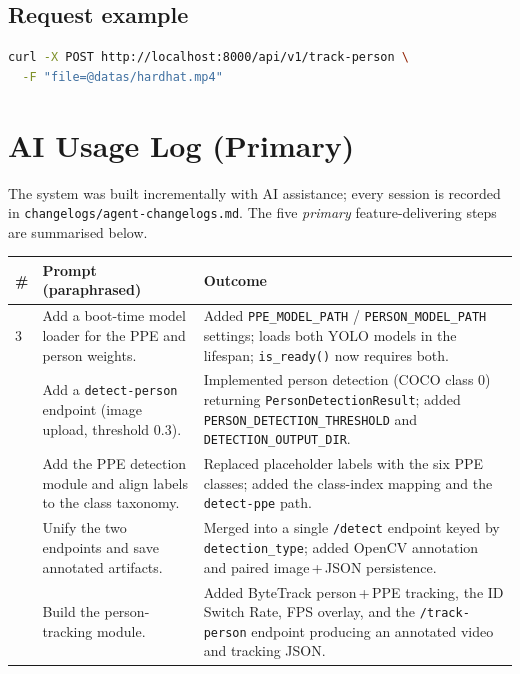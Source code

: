 \documentclass[11pt,a4paper]{article}
\begin{document}
\subsection{Request example}
\begin{lstlisting}[language=bash]
curl -X POST http://localhost:8000/api/v1/track-person \
  -F "file=@datas/hardhat.mp4"
\end{lstlisting}

\section{AI Usage Log (Primary)}

The system was built incrementally with AI assistance; every session is
recorded in \verb|changelogs/agent-changelogs.md|. The five \emph{primary}
feature-delivering steps are summarised below.

\begin{longtable}{p{0.5cm} p{4.3cm} p{9.0cm}}
\toprule
\textbf{\#} & \textbf{Prompt (paraphrased)} & \textbf{Outcome} \\
\midrule
\endhead
3 & Add a boot-time model loader for the PPE and person weights. &
Added \verb|PPE_MODEL_PATH| / \verb|PERSON_MODEL_PATH| settings; loads both YOLO
models in the lifespan; \verb|is_ready()| now requires both. \\
\addlinespace
4 & Add a \verb|detect-person| endpoint (image upload, threshold 0.3). &
Implemented person detection (COCO class 0) returning
\verb|PersonDetectionResult|; added \verb|PERSON_DETECTION_THRESHOLD| and
\verb|DETECTION_OUTPUT_DIR|. \\
\addlinespace
5 & Add the PPE detection module and align labels to the class taxonomy. &
Replaced placeholder labels with the six PPE classes; added the class-index
mapping and the \verb|detect-ppe| path. \\
\addlinespace
6 & Unify the two endpoints and save annotated artifacts. &
Merged into a single \verb|/detect| endpoint keyed by \verb|detection_type|;
added OpenCV annotation and paired image\,+\,JSON persistence. \\
\addlinespace
8 & Build the person-tracking module. &
Added ByteTrack person\,+\,PPE tracking, the ID Switch Rate, FPS overlay, and
the \verb|/track-person| endpoint producing an annotated video and tracking
JSON. \\
\bottomrule
\end{longtable}
\end{document}

